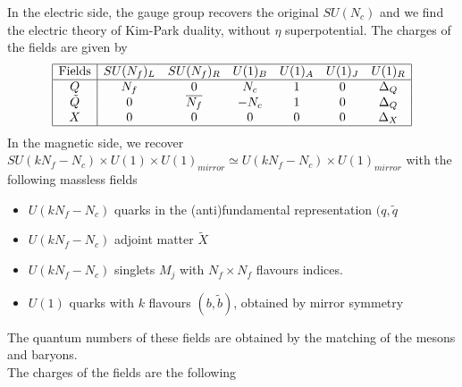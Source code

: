In the electric side, the gauge group recovers the original $SU(N_c)$ and we find the electric theory of Kim-Park duality, without $\eta$ superpotential.
The charges of the fields are given by
\begin{equation}
\begin{array}{| c | c c c c c c | }
\hline
\hbox{Fields} & SU(N_f)_L & SU(N_f)_R & U(1)_B & U(1)_A & U(1)_J & U(1)_R  \\
\hline
Q & N_f & 0  & N_c & 1 & 0  & \Delta_Q \\
\tilde{Q}   & 0  &\overline{N_f} &  - N_c & 1  & 0 & \Delta_Q \\
X & 0 & 0 & 0 & 0 &0 & \Delta_X \\
\hline
\end{array}
\end{equation}
In the magnetic side, we recover $SU(k N_f - N_c) \times U(1) \times U(1)_{mirror} \simeq U(k N_f - N_c) \times U(1)_{mirror}$ with the following massless fields
\begin{itemize}
\item $U(k N_f - N_c)$ quarks in the (anti)fundamental representation $(q,\tilde{q}$
\item $U(k N_f - N_c)$ adjoint matter $\tilde{X}$
\item $U(k N_f - N_c)$ singlets $M_j$ with $N_f \times N_f$ flavours indices.
\item $U(1) $ quarks with $k$ flavours $(b,\tilde{b})$, obtained by mirror symmetry 
\end{itemize}
The quantum numbers of these fields are obtained by the matching of the mesons and baryons.\\
The charges of the fields are the following
